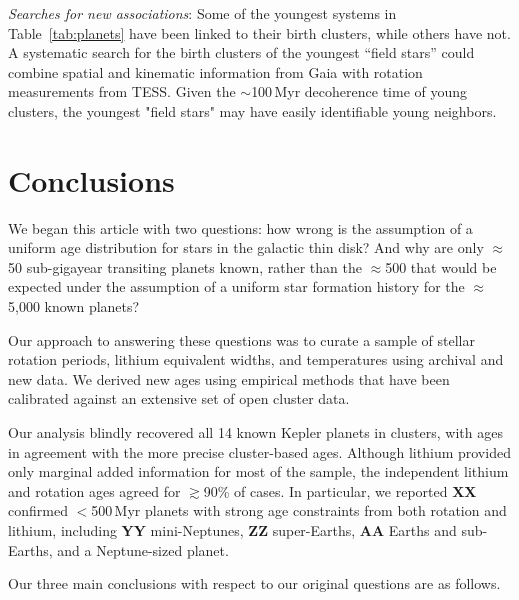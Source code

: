 \documentclass[11pt,twocolumn,tighten]{aastex63}
\begin{document}
{\it Searches for new associations}:
Some of the youngest systems in Table~\ref{tab:planets} have been
linked to their birth clusters, while others have not. A systematic
search for the birth clusters of the youngest ``field stars'' could
combine spatial and kinematic information from Gaia with rotation
measurements from TESS. Given the $\sim$100\,Myr decoherence time of
young clusters, the youngest "field stars" may have easily
identifiable young neighbors.



\section{Conclusions}
\label{sec:conclusions}

We began this article with two questions: how wrong is the assumption
of a uniform age distribution for stars in the galactic thin disk?
And why are only $\approx$50 sub-gigayear transiting planets known,
rather than the $\approx$500 that would be expected under the
assumption of a uniform star formation history for the
$\approx$5{,}000 known planets?

Our approach to answering these questions was to curate a sample of
stellar rotation periods, lithium equivalent widths, and temperatures
using archival and new data.  We derived new ages using empirical
methods that have been calibrated against an extensive set of open
cluster data.

Our analysis blindly recovered all 14 known Kepler planets in
clusters, with ages in agreement with the more precise cluster-based
ages.  Although lithium provided only marginal added information for
most of the sample, the independent lithium and rotation ages agreed
for $\gtrsim$90\% of cases.  In particular, we reported {\bf XX}
confirmed $<$500\,Myr planets with strong age constraints from both
rotation and lithium, including {\bf YY} mini-Neptunes, {\bf ZZ}
super-Earths, {\bf AA} Earths and sub-Earths, and a Neptune-sized
planet.

Our three main conclusions with respect to our original questions are
as follows.
\end{document}
